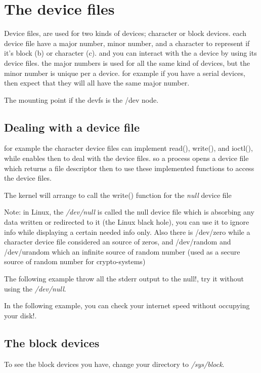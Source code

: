 \documentclass{article}
\begin{document}
\section{The device files}
Device files, are used for two kinds of devices; character or block devices.
each device file have a major number, minor number, and a character to represent if it's block (b) or character (c).
and you can interact with the a device by using its device files.
the major numbers is used for all the same kind of devices, but the minor number is unique per a device.
for example if you have a serial devices, then expect that they will all have the same major number.

The mounting point if the devfs is the /dev node.

\subsection{Dealing with a device file}
for example the character device files can implement read(), write(), and ioctl(), while enables then to deal with the device files.
so a process opens a device file which returns a file descriptor then to use these implemented functions to access the device files.


The kernel will arrange to call the write() function for the \textit{null} device file 

Note: in Linux, the \textit{/dev/null} is called the null device file which is absorbing any data written or redirected to it (the Linux black hole), you can use it to ignore info while displaying a certain needed info only.
Also there is /dev/zero while a character device file considered an source of zeros, and /dev/random and /dev/urandom which an infinite source of random number (used as a secure source of random number for crypto-systems)



The following example throw all the stderr output to the null!, try it without using the \textit{/dev/null}.

In the following example, you can check your internet speed without occupying your disk!. 


\subsection{The block devices}
To see the block devices you have, change your directory to \textit{/sys/block}.

\end{document}
